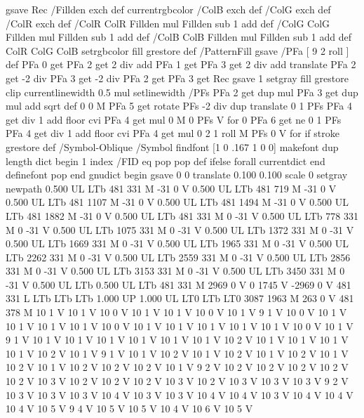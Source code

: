 {{{  gsave Rec
  /Fillden exch def
  currentrgbcolor
  /ColB exch def /ColG exch def /ColR exch def
  /ColR ColR Fillden mul Fillden sub 1 add def
  /ColG ColG Fillden mul Fillden sub 1 add def
  /ColB ColB Fillden mul Fillden sub 1 add def
  ColR ColG ColB setrgbcolor
  fill grestore } def
%
%
/PatternFill { gsave /PFa [ 9 2 roll ] def
    PFa 0 get PFa 2 get 2 div add PFa 1 get PFa 3 get 2 div add translate
    PFa 2 get -2 div PFa 3 get -2 div PFa 2 get PFa 3 get Rec
    gsave 1 setgray fill grestore clip
    currentlinewidth 0.5 mul setlinewidth
    /PFs PFa 2 get dup mul PFa 3 get dup mul add sqrt def
    0 0 M PFa 5 get rotate PFs -2 div dup translate
	0 1 PFs PFa 4 get div 1 add floor cvi
	{ PFa 4 get mul 0 M 0 PFs V } for
    0 PFa 6 get ne {
	0 1 PFs PFa 4 get div 1 add floor cvi
	{ PFa 4 get mul 0 2 1 roll M PFs 0 V } for
    } if
    stroke grestore } def
%
/Symbol-Oblique /Symbol findfont [1 0 .167 1 0 0] makefont
dup length dict begin {1 index /FID eq {pop pop} {def} ifelse} forall
currentdict end definefont pop
end
gnudict begin
gsave
0 0 translate
0.100 0.100 scale
0 setgray
newpath
0.500 UL
LTb
481 331 M
-31 0 V
0.500 UL
LTb
481 719 M
-31 0 V
0.500 UL
LTb
481 1107 M
-31 0 V
0.500 UL
LTb
481 1494 M
-31 0 V
0.500 UL
LTb
481 1882 M
-31 0 V
0.500 UL
LTb
481 331 M
0 -31 V
0.500 UL
LTb
778 331 M
0 -31 V
0.500 UL
LTb
1075 331 M
0 -31 V
0.500 UL
LTb
1372 331 M
0 -31 V
0.500 UL
LTb
1669 331 M
0 -31 V
0.500 UL
LTb
1965 331 M
0 -31 V
0.500 UL
LTb
2262 331 M
0 -31 V
0.500 UL
LTb
2559 331 M
0 -31 V
0.500 UL
LTb
2856 331 M
0 -31 V
0.500 UL
LTb
3153 331 M
0 -31 V
0.500 UL
LTb
3450 331 M
0 -31 V
0.500 UL
LTb
0.500 UL
LTb
481 331 M
2969 0 V
0 1745 V
-2969 0 V
481 331 L
LTb
LTb
LTb
1.000 UP
1.000 UL
LT0
LTb
LT0
3087 1963 M
263 0 V
481 378 M
10 1 V
10 1 V
10 0 V
10 1 V
10 1 V
10 0 V
10 1 V
9 1 V
10 0 V
10 1 V
10 1 V
10 1 V
10 1 V
10 0 V
10 1 V
10 1 V
10 1 V
10 1 V
10 1 V
10 0 V
10 1 V
9 1 V
10 1 V
10 1 V
10 1 V
10 1 V
10 1 V
10 1 V
10 2 V
10 1 V
10 1 V
10 1 V
10 1 V
10 2 V
10 1 V
9 1 V
10 1 V
10 2 V
10 1 V
10 2 V
10 1 V
10 2 V
10 1 V
10 2 V
10 1 V
10 2 V
10 2 V
10 2 V
10 1 V
9 2 V
10 2 V
10 2 V
10 2 V
10 2 V
10 2 V
10 3 V
10 2 V
10 2 V
10 2 V
10 3 V
10 2 V
10 3 V
10 3 V
10 3 V
9 2 V
10 3 V
10 3 V
10 3 V
10 4 V
10 3 V
10 3 V
10 4 V
10 4 V
10 3 V
10 4 V
10 4 V
10 4 V
10 5 V
9 4 V
10 5 V
10 5 V
10 4 V
10 6 V
10 5 V
}}
